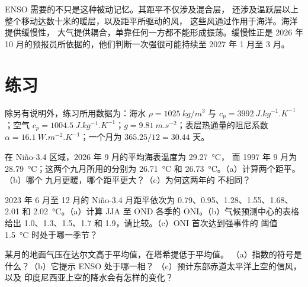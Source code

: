ENSO 需要的不只是这种被动记忆。其距平不仅涉及混合层，
还涉及温跃层以上整个移动达数十米的暖层，以及距平所驱动的风，
这些风通过作用于海洋。海洋提供缓慢性，
大气提供耦合，单靠任何一方都不能形成振荡。缓慢性正是
2026 年 10 月的预报员所依据的，他们判断一次强很可能持续至
2027 年 1 月至 3 月。

\section*{练习}\label{sec:b2:climate-variability:exercises}

除另有说明外，练习所用数据为：海水 $\rho = \qty{1025}{kg/m^3}$ 与 $c_p =
\qty{3992}{J.kg^{-1}.K^{-1}}$；空气 $c_p = \qty{1004.5}{J.kg^{-1}.K^{-1}}$；$g =
\qty{9.81}{m.s^{-2}}$；表层热通量的阻尼系数 $\alpha =
\qty{16.1}{W.m^{-2}.K^{-1}}$；一个月为 $365.25/12 = 30.44$ 天。

\begin{exercise}[$\star$]\label{exo:b2:climate-variability:1}
在 Niño-3.4 区域，2026 年 9 月的平均海表温度为 \qty{29.27}{\celsius}，
而 1997 年 9 月为 \qty{28.79}{\celsius}；这两个九月所用的分别为
\qty{26.71}{\celsius} 和 \qty{26.73}{\celsius}。（a）计算两个距平。（b）哪个
九月更暖，哪个距平更大？（c）为何这两年的
不相同？
\end{exercise}

\begin{exercise}[$\star$]\label{exo:b2:climate-variability:2}
2023 年 6 月至 12 月的 Niño-3.4 月距平依次为 0.79、0.95、1.28、1.55、1.68、2.01
和 \qty{2.02}{\celsius}。（a）计算 JJA 至 OND 各季的 ONI。（b）气候预测中心的表格
给出 1.0、1.3、1.5、1.7 和 1.9，请比较。（c）ONI 首次达到强事件的
阈值 \qty{1.5}{\celsius} 时处于哪一季节？
\end{exercise}

\begin{exercise}[$\star$]\label{exo:b2:climate-variability:3}
某月的地面气压在达尔文高于平均值，在塔希提低于平均值。
（a）指数的符号是什么？（b）它提示 ENSO 处于哪一相？
（c）预计东部赤道太平洋上空的信风，以及
印度尼西亚上空的降水会有怎样的变化？
\end{exercise}

